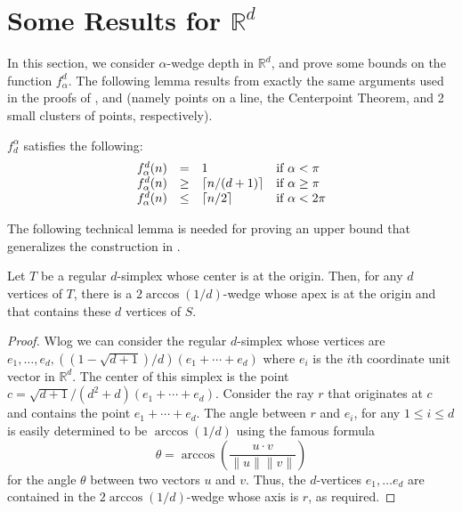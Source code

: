 \documentclass[lotsofwhite]{patmorin}
\begin{document}
\section{Some Results for $\mathbb{R}^d$}

In this section, we consider $\alpha$-wedge depth in $\mathbb{R}^d$,
and prove  some bounds on the function $f^d_\alpha$.  The following
lemma results from exactly the same arguments used in the proofs of
,  and  (namely points on a line, the
Centerpoint Theorem, and 2 small clusters of points, respectively).

\begin{lem}
$f^\alpha_d$ satisfies the following:
\[\begin{array}{lcll}
  f^d_\alpha(n) & = & 1 & \mbox{if $\alpha < \pi$} \\
  f^d_\alpha(n) & \ge & \left\lceil n/(d+1) \right\rceil & \mbox{if $\alpha \ge \pi$} \\
  f^d_\alpha(n) & \le & \left\lceil n/2 \right\rceil & \mbox{if $\alpha < 2\pi$} \\
\end{array}\]
\end{lem}

The following technical lemma is needed for proving an upper bound
that generalizes the construction in .

\begin{lem}
Let $T$ be a regular $d$-simplex whose center is at the origin.  Then,
for any $d$ vertices of $T$, there is a $2\arccos(1/d)$-wedge whose
apex is at the origin and that contains these $d$ vertices of $S$.
\end{lem}

\begin{proof} 
Wlog we can consider the regular $d$-simplex whose vertices are
$e_1,\ldots,e_d, ((1-\sqrt{d+1})/d)(e_1+\cdots+e_d)$ where $e_i$ is the
$i$th coordinate unit vector in $\mathbb{R}^d$.  The center of this
simplex is the point $c=\sqrt{d+1}/(d^2+d)(e_1+\cdots+ e_d)$.
Consider the ray $r$ that originates at $c$ and
contains the point $e_1+\cdots+e_d$.  The angle between $r$ and
$e_i$, for any $1\le i\le d$ is easily determined to be
$\arccos(1/d)$ using the famous formula 
\[
   \theta = \arccos \left(\frac{u\cdot v}{\|u\|\|v\|}\right) 
\]
for the angle $\theta$ between two vectors $u$ and $v$.   Thus,
the $d$-vertices $e_1,\ldots e_d$ are contained in the
$2\arccos(1/d)$-wedge whose axis is $r$, as required.
\end{proof}
\end{document}
